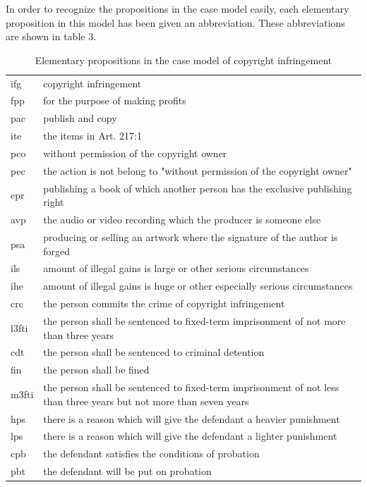 \documentclass{IOS-Book-Article}
\begin{document}
In order to recognize the propositions in the case model easily, each elementary proposition in this model has been given an abbreviation. These abbreviations are shown in table 3.

\footnotesize
\begin{table}[htbp]
\caption{Elementary propositions in the case model of copyright infringement}
\centering
\begin{tabularx}{120mm}{>{\hsize=0.2\hsize}X>{\hsize=1.6\hsize}X}
\hline
ifg & copyright infringement\\
fpp & for the purpose of making profits\\
pac & publish and copy\\
ite & the items in Art. 217:1\\
pco & without permission of the copyright owner\\
pec & the action is not belong to "without permission of the copyright owner"\\
epr & publishing a book of which another person has the exclusive publishing right\\
avp & the audio or video recording which the producer is someone else\\
psa & producing or selling an artwork where the signature of the author is forged\\
ils & amount of illegal gains is large or other serious circumstances\\
ihe & amount of illegal gains is huge or other especially serious circumstances\\
crc & the person commits the crime of copyright infringement\\
l3fti & the person shall be sentenced to fixed-term imprisonment of not more than three years\\
cdt & the person shall be sentenced to criminal detention\\
fin & the person shall be fined\\
m3fti & the person shall be sentenced to fixed-term imprisonment of not less than three years but not more than seven years\\
hps & there is a reason which will give the defendant a heavier punishment\\
lps & there is a reason which will give the defendant a lighter punishment\\
cpb & the defendant satisfies the conditions of probation\\
pbt & the defendant will be put on probation\\
\hline
\end{tabularx}
\end{table}
\end{document}
